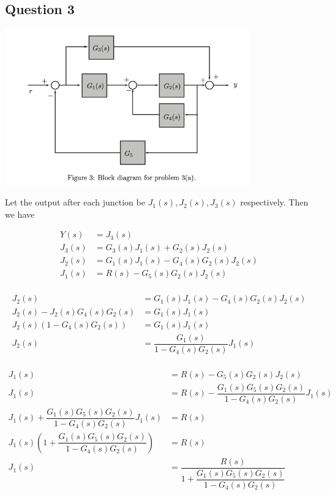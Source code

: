 \documentclass[11pt]{article}
\begin{document}
\subsection{Question 3}

\includegraphics[width=300pt]{midterm_2012_q3.png}

Let the output after each junction be $J_1(s), J_2(s), J_3(s)$ respectively. Then we have

\begin{align*}
    Y(s) &= J_3(s) \\
    J_3(s) &= G_3(s) J_1(s) + G_2(s) J_2(s) \\
    J_2(s) &= G_1(s) J_1(s) - G_4(s) G_2(s) J_2(s) \\
    J_1(s) &= R(s) - G_5(s) G_2(s) J_2(s) \\
\end{align*}

\begin{align*}
    J_2(s) &= G_1(s) J_1(s) - G_4(s) G_2(s) J_2(s) \\
    J_2(s) -  J_2(s) G_4(s) G_2(s) &= G_1(s) J_1(s) \\
    J_2(s) (1 - G_4(s) G_2(s)) &= G_1(s) J_1(s) \\
    J_2(s) &= \dfrac{G_1(s)}{1 - G_4(s) G_2(s)} J_1(s) \\
\end{align*}

\begin{align*}
    J_1(s) &= R(s) - G_5(s) G_2(s) J_2(s) \\
    J_1(s) &= R(s) - \dfrac{G_1(s) G_5(s) G_2(s)}{1 - G_4(s) G_2(s)} J_1(s) \\
    J_1(s) + \dfrac{G_1(s) G_5(s) G_2(s)}{1 - G_4(s) G_2(s)} J_1(s) &= R(s) \\
    J_1(s) \left(1 + \dfrac{G_1(s) G_5(s) G_2(s)}{1 - G_4(s) G_2(s)} \right) &= R(s) \\
    J_1(s) &= \dfrac{R(s)}{1 + \dfrac{G_1(s) G_5(s) G_2(s)}{1 - G_4(s) G_2(s)}}  \\
\end{align*}
\end{document}
